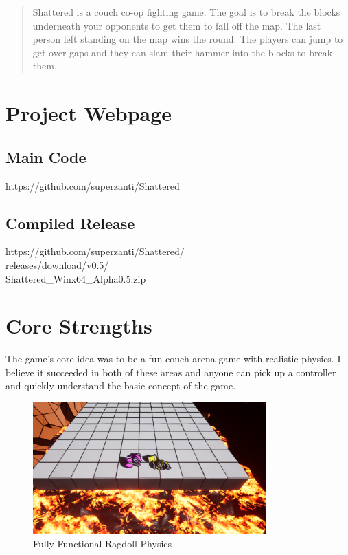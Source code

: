 \documentclass[conference,compsoc]{IEEEtran}
\begin{document}
\begin{abstract}
Shattered is a couch co-op fighting game. The goal is to break the blocks underneath your opponents to get them to fall off the map. The last person left standing on the map wins the round. The players can jump to get over gaps and they can slam their hammer into the blocks to break them.
\end{abstract}

\section{Project Webpage}

\subsection{Main Code}
https://github.com/superzanti/Shattered

\subsection{Compiled Release}
https://github.com/superzanti/Shattered/\\
releases/download/v0.5/\\
Shattered\_Winx64\_Alpha0.5.zip

\section{Core Strengths}

The game's core idea was to be a fun couch arena game with realistic physics. I believe it succeeded in both of these areas and anyone can pick up a controller and quickly understand the basic concept of the game.

\begin{figure}[b]
  \centering
  \includegraphics[width=0.8\textwidth]{simulated_ragdoll.png}%
  \caption{Fully Functional Ragdoll Physics}
\end{figure}
\end{document}
